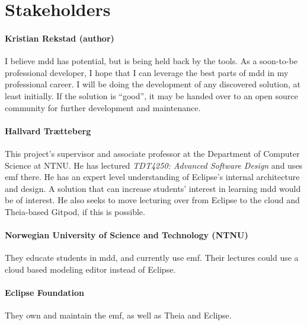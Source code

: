 \section{Stakeholders}

\paragraph*{Kristian Rekstad (author)} I believe \acrfull{mdd} has potential, but is being held back by the tools. As a soon-to-be professional developer, I hope that I can leverage the best parts of \acrshort{mdd} in my professional career.
I will be doing the development of any discovered solution, at least initially.
If the solution is ``good'', it may be handed over to an \gls{open source} community for further development and maintenance.

\paragraph*{Hallvard Trætteberg} This project's supervisor and associate professor at the Department of Computer Science at \acrshort{NTNU}. 
He has lectured \textit{TDT4250: Advanced Software Design} and uses \acrshort{emf} there.
He has an expert level understanding of \gls{Eclipse}'s internal architecture and design.
A solution that can increase students' interest in learning \acrshort{mdd} would be of interest. 
He also seeks to move lecturing over from \gls{Eclipse} to the \gls{cloud} and \gls{Theia}-based \gls{Gitpod}, if this is possible.

\paragraph*{Norwegian University of Science and Technology (\acrshort{NTNU})} They educate students in \acrlong{mdd}, and currently use \acrshort{emf}. Their lectures could use a cloud based modeling editor instead of \gls{Eclipse}.

\paragraph*{Eclipse Foundation} They own and maintain the \acrlong{emf}, as well as \gls{Theia} and \gls{Eclipse}.


